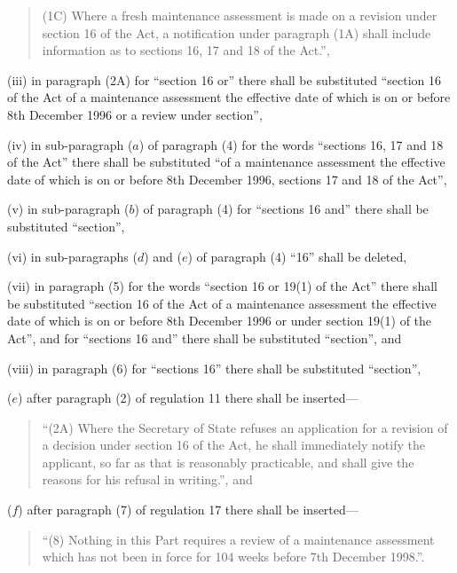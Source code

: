 \documentclass[12pt,a4paper]{article}
\begin{document}
\begin{enumerate}
\begin{enumerate}
\begin{quotation}
(1C) Where a fresh maintenance assessment is made on a revision under section 16 of the Act, a notification under paragraph (1A) shall include information as to sections 16, 17 and 18 of the Act.”,
\end{quotation}

(iii) in paragraph (2A) for “section 16 or” there shall be substituted “section 16 of the Act of a maintenance assessment the effective date of which is on or before 8th December 1996 or a review under section”,

(iv) in sub-paragraph ($a$) of paragraph (4) for the words “sections 16, 17 and 18 of the Act” there shall be substituted “of a maintenance assessment the effective date of which is on or before 8th December 1996, sections 17 and 18 of the Act”,

(v) in sub-paragraph ($b$) of paragraph (4) for “sections 16 and” there shall be substituted “section”,

(vi) in sub-paragraphs ($d$) and ($e$) of paragraph (4) “16” shall be deleted,

(vii) in paragraph (5) for the words “section 16 or 19(1) of the Act” there shall be substituted “section 16 of the Act of a maintenance assessment the effective date of which is on or before 8th December 1996 or under section 19(1) of the Act”, and for “sections 16 and” there shall be substituted “section”, and

(viii) in paragraph (6) for “sections 16” there shall be substituted “section”,
\end{enumerate}

($e$) after paragraph (2) of regulation 11 there shall be inserted—
\begin{quotation}
“(2A) Where the Secretary of State refuses an application for a revision of a decision under section 16 of the Act, he shall immediately notify the applicant, so far as that is reasonably practicable, and shall give the reasons for his refusal in writing.”, and
\end{quotation}

($f$) after paragraph (7) of regulation 17 there shall be inserted—
\begin{quotation}
“(8) Nothing in this Part requires a review of a maintenance assessment which has not been in force for 104 weeks before 7th December 1998.”.
\end{quotation}
\end{enumerate}
\end{document}
